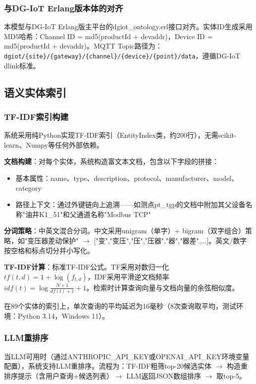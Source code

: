 \documentclass[12pt,a4paper]{article}
\begin{document}
\subsubsection{与DG-IoT Erlang版本体的对齐}

本模型与DG-IoT Erlang版主平台的dgiot\_ontology.erl接口对齐。实体ID生成采用MD5哈希：Channel ID = md5(productId + devaddr)，Device ID = md5(productId + devaddr)。MQTT Topic路径为：\texttt{dgiot/\{site\}/\{gateway\}/\{channel\}/\{device\}/\{point\}/data}，遵循DG-IoT dlink标准。

\subsection{语义实体索引}

\subsubsection{TF-IDF索引构建}

系统采用纯Python实现TF-IDF索引（EntityIndex类，约200行），无需scikit-learn、Numpy等任何外部依赖。

\textbf{文档构建}：对每个实体，系统构造富文本文档，包含以下字段的拼接：
\begin{itemize}
  \item 基本属性：name、type、description、protocol、manufacturer、model、category
  \item 路径上下文：通过外键链向上追溯——如测点pt\_tgp的文档中附加其父设备名称"油井K1\_51"和父通道名称"Modbus TCP"
\end{itemize}

\textbf{分词策略}：中英文混合分词。中文采用unigram（单字）+ bigram（双字组合）策略，如"变压器差动保护" $\to$ ["变","变压","压","压器","器","器差",$\dots$]。英文/数字按空格和标点切分并小写化。

\textbf{TF-IDF计算}：标准TF-IDF公式。TF采用对数归一化 $tf(t,d) = 1 + \log(f_{t,d})$，IDF采用平滑逆文档频率 $idf(t) = \log\frac{N+1}{df(t)+1} + 1$。检索时计算查询向量与文档向量的余弦相似度。

在89个实体的索引上，单次查询的平均延迟为16毫秒（8次查询取平均，测试环境：Python 3.14，Windows 11）。

\subsubsection{LLM重排序}

当LLM可用时（通过ANTHROPIC\_API\_KEY或OPENAI\_API\_KEY环境变量配置），系统支持LLM重排序。流程为：TF-IDF粗筛top-20候选实体 $\to$ 构造重排序提示（含用户查询+候选列表）$\to$ LLM返回JSON数组排序 $\to$ 取top-5。
\end{document}
